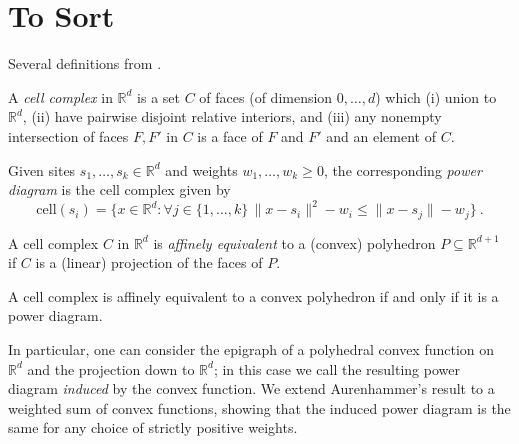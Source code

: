 \documentclass[anon,12pt]{colt2019}
\newcommand{\Comments}{1}
\newcommand{\mynote}[2]{\ifnum\Comments=1\textcolor{#1}{#2}\fi}
\newcommand{\jessie}[1]{\mynote{purple}{[JF: #1]}}
\newcommand{\reals}{\mathbb{R}}
\newcommand{\cell}{\mathrm{cell}}
\newcommand{\inter}[1]{\mathring{#1}}%
\begin{document}



\section{To Sort}

Several definitions from \citet{aurenhammer1987power}.
\begin{definition}\label{def:cell-complex}
  A \emph{cell complex} in $\reals^d$ is a set $C$ of faces (of dimension $0,\ldots,d$) which (i) union to $\reals^d$, (ii) have pairwise disjoint relative interiors, and (iii) any nonempty intersection of faces $F,F'$ in $C$ is a face of $F$ and $F'$ and an element of $C$.
\end{definition}

\begin{definition}\label{def:power-diagram}
  Given sites $s_1,\ldots,s_k\in\reals^d$ and weights $w_1,\ldots,w_k \geq 0$, the corresponding \emph{power diagram} is the cell complex given by
  \begin{equation}
    \label{eq:pd}
    \cell(s_i) = \{ x \in\reals^d : \forall j \in \{1,\ldots,k\} \, \|x - s_i\|^2 - w_i \leq \|x - s_j\| - w_j\}~.
  \end{equation}
\end{definition}

\begin{definition}\label{def:affine-equiv}
  A cell complex $C$ in $\reals^d$ is \emph{affinely equivalent} to a (convex) polyhedron $P \subseteq \reals^{d+1}$ if $C$ is a (linear) projection of the faces of $P$.
\end{definition}

\begin{theorem}\label{thm:aurenhammer}
  A cell complex is affinely equivalent to a convex polyhedron if and only if it is a power diagram.
\end{theorem}

In particular, one can consider the epigraph of a polyhedral convex function on $\reals^d$ and the projection down to $\reals^d$; in this case we call the resulting power diagram \emph{induced} by the convex function.
We extend Aurenhammer's result to a weighted sum of convex functions, showing that the induced power diagram is the same for any choice of strictly positive weights.
\end{document}
